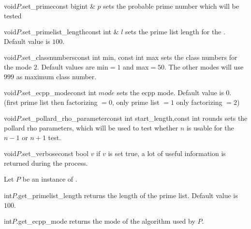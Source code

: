 \begin{fcode}{void}{$P$.set_prime}{const bigint & $p$} 
        sets the probable prime number which will be tested
\end{fcode}
\begin{fcode}{void}{$P$.set_primelist_length}{const int & $l$}
        sets the prime list length for the . Default value is $100$.
\end{fcode}
\begin{fcode}{void}{$P$.set_classnumbers}{const int  min, const int  max}
        sets the class numbers for the  mode $2$. Default values are min$=1$ and max$=50$.
        The other modes will use $999$ as maximum class number.
\end{fcode}
\begin{fcode}{void}{$P$.set_ecpp_mode}{const int  $mode$}
        sets the ecpp mode. Default value is $0$. (first prime list then factorizing $= 0$, only prime list $= 1$       only factorizing $=2$)
\end{fcode}
\begin{fcode}{void}{$P$.set_pollard_rho_parameter}{const int  start_length,const int  rounds}
        sets the pollard rho parameters, which will be used to test whether $n$ is usable for the $n-1$ or $n+1$ test.
\end{fcode}

\begin{fcode}{void}{$P$.set_verbose}{const bool $v$}
        if $v$ is set true, a lot of useful information is returned during the process.
\end{fcode}



\ACCS

Let $P$ be an instance of .
\begin{cfcode}{int}{$P$.get_primelist_length}{}
        returns  the length of the  prime list. Default value is $100$.
\end{cfcode}
\begin{cfcode}{int}{$P$.get_ecpp_mode}{}
        returns  the mode of the  algorithm used by $P$.
\end{cfcode}




